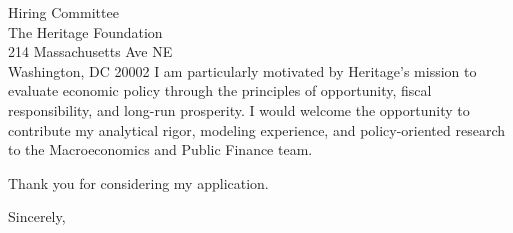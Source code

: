 \documentclass[11pt,letterpaper]{letter}
\begin{document}
\begin{letter}{Hiring Committee \\
The Heritage Foundation \\
214 Massachusetts Ave NE \\
Washington, DC 20002}
I am particularly motivated by Heritage’s mission to evaluate economic policy through the principles of opportunity, fiscal responsibility, and long-run prosperity. I would welcome the opportunity to contribute my analytical rigor, modeling experience, and policy-oriented research to the Macroeconomics and Public Finance team.

Thank you for considering my application.

\closing{Sincerely,}

\end{letter}
\end{document}
